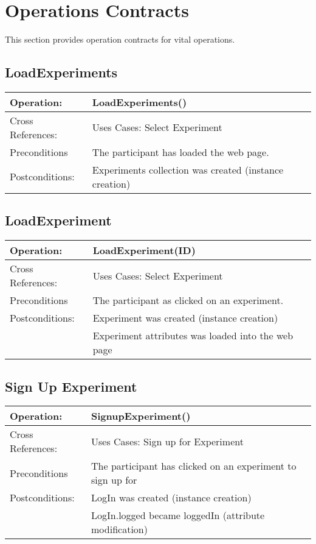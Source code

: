 \section{Operations Contracts}
This section provides operation contracts for vital operations.

\subsection{LoadExperiments}
\begin{tabular}{|l|l|}
\hline Operation: & LoadExperiments() \\ 
\hline Cross References: & Uses Cases: Select Experiment \\ 
\hline Preconditions & The participant has loaded the web page. \\ 
\hline Postconditions: & Experiments collection was created (instance creation) \\
\hline 
\end{tabular}

\subsection{LoadExperiment}
\begin{tabular}{|l|l|}
\hline Operation: & LoadExperiment(ID) \\ 
\hline Cross References: & Uses Cases: Select Experiment \\ 
\hline Preconditions & The participant as clicked on an experiment. \\ 
\hline Postconditions: & Experiment was created (instance creation) \\
\hline & Experiment attributes was loaded into the web page \\
\hline 
\end{tabular}

\subsection{Sign Up Experiment}
\begin{tabular}{|l|l|}
\hline Operation: & SignupExperiment() \\ 
\hline Cross References: & Uses Cases: Sign up for Experiment \\ 
\hline Preconditions & The participant has clicked on an experiment to sign up for \\ 
\hline Postconditions: & LogIn was created (instance creation) \\
\hline & LogIn.logged became loggedIn (attribute modification) \\
\hline 
\end{tabular}

